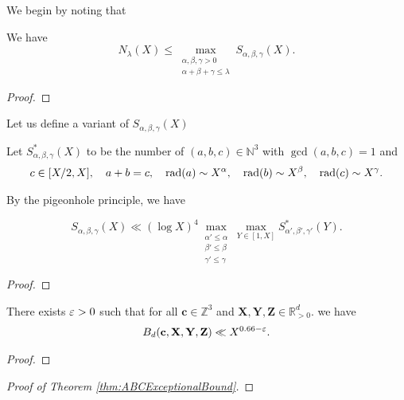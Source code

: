 We
 begin by noting that
\begin{lemma}\label{lem:NlambdatoS}
We have
\begin{equation}\label{eq:step1}
N_\lambda(X)\leq \max_{\substack{
\alpha,\beta,\gamma>0\\ \alpha+\beta+\gamma\leq \lambda}} S_{\alpha,\beta,\gamma}(X).
\end{equation}
\end{lemma}
\begin{proof}
\end{proof}
Let us define a variant of $S_{\alpha,\beta,\gamma}(X)$
\begin{definition}\label{def:Sstar}
  Let $S^*_{\alpha,\beta,\gamma}(X)$ to be the number of $(a,b,c)\in \mathbb{N}^3$ with $\gcd(a,b,c)=1$ and
  \begin{align*}
  c\in [X/2,X],\quad a+b=c,\quad \operatorname{rad}(a)\sim X^{\alpha},\quad \operatorname{rad}(b)\sim X^{\beta},\quad \operatorname{rad}(c)\sim X^{\gamma}.
  \end{align*}
\end{definition}


By the pigeonhole principle, we have

\begin{lemma}\label{lem:StoSstar}
\begin{equation}\label{eq:S->S*}
S_{\alpha,\beta,\gamma}(X)\ll (\log X)^4\max_{\substack{\alpha'\leq \alpha\\\beta'\leq \beta\\\gamma'\leq \gamma}}\max_{Y\in [1,X]}S^*_{\alpha',\beta',\gamma'}(Y).
\end{equation}
\end{lemma}
\begin{proof}
\end{proof}


\begin{theorem}\label{thm:BdExceptionalBound}
  There exists $\varepsilon>0$ such that for all
  $\mathbf{c}\in \mathbb{Z}^3$ and $\mathbf{X},\mathbf{Y},\mathbf{Z}\in \mathbb{R}_{>0}^{d}$. we have
\begin{align}
B_d({\bf c, X,Y,Z}) \ll  X^{0.66-\varepsilon}.
\end{align}
\end{theorem}
\begin{proof}
\end{proof}

\begin{proof}[Proof of Theorem \ref{thm:ABCExceptionalBound}]
  \end{proof}


